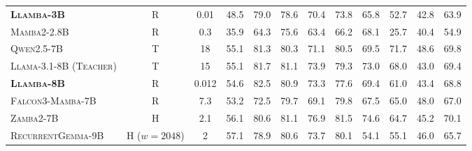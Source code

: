 \begin{table}[H]
\begin{tabular}{l c c c c c c c c c c c}
\textbf{\textsc{Llamba-3B}} & R
& 0.01      & 48.5 & 79.0 & 78.6 & 70.4 & 73.8 & 65.8 & 52.7 & 42.8 & 63.9 \\

\textsc{Mamba2-2.8B} & R
& 0.3       & 35.9 & 64.3 & 75.6 & 63.4 & 66.2 & 68.1 & 25.7 & 40.4 & 54.9 \\

\midrule

\textsc{Qwen2.5-7B} & T
& 18        & 55.1 & 81.3 & 80.3 & 71.1 & 80.5 & 69.5 & 71.7 & 48.6 & 69.8 \\

\textsc{Llama-3.1-8B (Teacher)} & T
& 15        & 55.1 & 81.7 & 81.1 & 73.9 & 79.3 & 73.0 & 68.0 & 43.0 & 69.4 \\

\textbf{\textsc{Llamba-8B}} & R
& 0.012     & 54.6 & 82.5 & 80.9 & 73.3 & 77.6 & 69.4 & 61.0 & 43.4 & 68.8 \\

\textsc{Falcon3-Mamba-7B} & R
& 7.3       & 53.2 & 72.5 & 79.7 & 69.1 & 79.8 & 67.5 & 65.0 & 48.0 & 67.0 \\

\textsc{Zamba2-7B} & H
& 2.1       & 56.1 & 80.6 & 81.1 & 76.9 & 81.5 & 74.6 & 64.7 & 45.2 & 70.1 \\

\textsc{RecurrentGemma-9B} & H ($w=2048$)
& 2         & 57.1 & 78.9 & 80.6 & 73.7 & 80.1 & 54.1 & 55.1 & 46.0 & 65.7 \\

\bottomrule
\end{tabular}
\end{table}